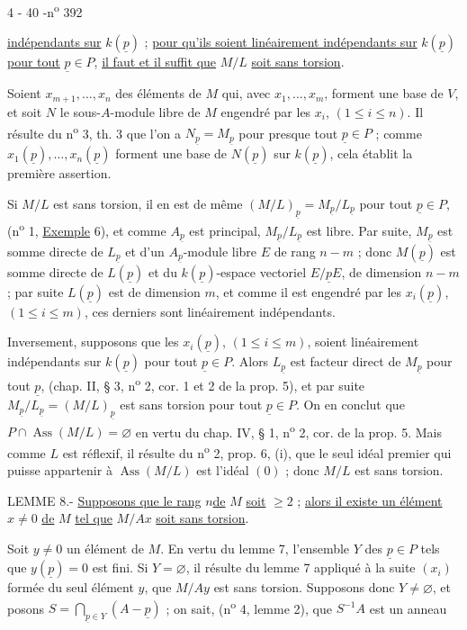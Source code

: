 \begin{center}4 - 40 -\hfill n\textsuperscript{o} 392\end{center}

\uline{indépendants sur} $k(\underline{p})$ ; \uline{pour qu'ils soient linéairement indépendants sur} $k(\underline{p})$ \uline{pour tout} $\underline{p}\in P$, \uline{il faut et il suffit que} $M/L$ \uline{soit sans torsion}.

Soient $x_{m+1},\ldots,x_n$ des éléments de $M$ qui, avec $x_1,\ldots,x_m$, forment une base de $V$, et soit $N$ le sous-$A$-module libre de $M$ engendré par les $x_i$, $(1\le i\le n)$. Il résulte du n\textsuperscript{o} 3, th. 3 que l'on a $N_{\underline{p}}=M_{\underline{p}}$ pour presque tout $\underline{p}\in P$ ; comme $x_1(\underline{p}),\ldots,x_n(\underline{p})$ forment une base de $N(\underline{p})$ sur $k(\underline{p})$, cela établit la première assertion.

Si $M/L$ est sans torsion, il en est de même  $(M/L)_{\underline{p}}=M_{\underline{p}}/L_{\underline{p}}$ pour tout $\underline{p}\in P$, (n\textsuperscript{o} 1, \uline{Exemple} 6), et comme $A_{\underline{p}}$ est principal, $M_{\underline{p}}/L_{\underline{p}}$ est libre. Par suite, $M_{\underline{p}}$ est somme directe de $L_{\underline{p}}$ et d'un $A_{\underline{p}}$-module libre $E$ de rang $n-m$ ; donc $M(\underline{p})$ est somme directe de $L(\underline{p})$ et du $k(\underline{p})$-espace vectoriel $E/\underline{p}E$, de dimension $n-m$ ; par suite $L(\underline{p})$ est de dimension $m$, et comme il est engendré par les $x_i(\underline{p})$, $(1\le i\le m)$, ces derniers sont linéairement indépendants.

Inversement, supposons que les $x_i(\underline{p})$, $(1\le i\le m)$, soient linéairement indépendants sur $k(\underline{p})$ pour tout $\underline{p}\in P$. Alors $L_{\underline{p}}$ est facteur direct de $M_{\underline{p}}$ pour tout $\underline{p}$, (chap. II, § 3, n\textsuperscript{o} 2, cor. 1 et 2 de la prop. 5), et par suite $M_{\underline{p}}/L_{\underline{p}}=(M/L)_{\underline{p}}$ est sans torsion pour tout $\underline{p}\in P$. On en conclut que $P\cap\operatorname{Ass}(M/L)=\varnothing$ en vertu du chap. IV, § 1, n\textsuperscript{o} 2, cor. de la prop. 5. Mais comme $L$ est réflexif, il résulte du n\textsuperscript{o} 2, prop. 6, (i), que le seul idéal premier qui puisse appartenir à $\operatorname{Ass}(M/L)$ est l'idéal $(0)$ ; donc $M/L$ est sans torsion.

LEMME 8.- \uline{Supposons que le rang} $n$\unsure{-}\uline{de} $M$ \uline{soit} $\ge2$ ; \uline{alors il existe un élément} $x\ne0$ \uline{de} $M$ \uline{tel que} $M/Ax$ \uline{soit sans torsion}.

Soit $y\ne0$ un élément de $M$. En vertu du lemme 7, l'ensemble $Y$ des $\underline{p}\in P$ tels que $y(\underline{p})=0$ est fini. Si $Y=\varnothing$, il résulte du lemme 7 appliqué à la suite $(x_i)$ formée du seul élément $y$, que $M/Ay$ est sans torsion. Supposons donc $Y\ne\varnothing$, et posons $S=\bigcap_{\underline{p}\in Y}(A-\underline{p})$ ; on sait, (n\textsuperscript{o} 4, lemme 2), que $S^{-1}A$ est un anneau

